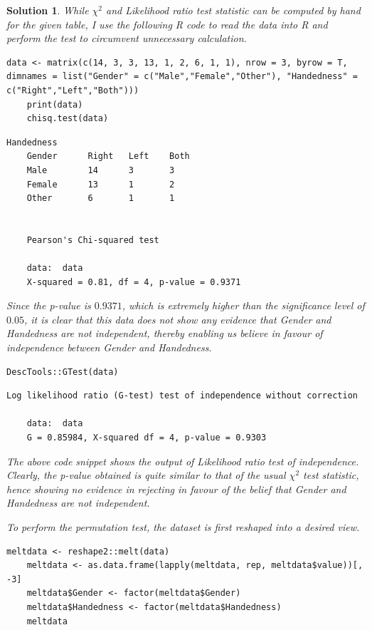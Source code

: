 \documentclass[12pt]{article}
\theoremstyle{problemstyle}
\newtheorem*{solution*}{Solution}
\begin{document}
\begin{solution*}

While $\chi^2$ and Likelihood ratio test statistic can be computed by hand for the given table, I use the following R code to read the data into R and perform the test to circumvent unnecessary calculation.

\begin{lstlisting}[style = R-code]
	data <- matrix(c(14, 3, 3, 13, 1, 2, 6, 1, 1), nrow = 3, byrow = T, dimnames = list("Gender" = c("Male","Female","Other"), "Handedness" = c("Right","Left","Both")))
	print(data)
	chisq.test(data)
\end{lstlisting}

\begin{lstlisting}[style = R-output]
	        	Handedness
	Gender   	Right 	Left 	Both
	Male      	14    	3    	3
	Female    	13    	1    	2
	Other      	6    	1    	1
	
	
	Pearson's Chi-squared test
	
	data:  data
	X-squared = 0.81, df = 4, p-value = 0.9371
\end{lstlisting}

Since the p-value is $0.9371$, which is extremely higher than the significance level of $0.05$, it is clear that this data does not show any evidence that Gender and Handedness are not independent, thereby enabling us believe in favour of independence between Gender and Handedness.

\begin{lstlisting}[style = R-code]
DescTools::GTest(data)
\end{lstlisting}

\begin{lstlisting}[style = R-output]
		Log likelihood ratio (G-test) test of independence without correction
	
	data:  data
	G = 0.85984, X-squared df = 4, p-value = 0.9303
\end{lstlisting}

The above code snippet shows the output of Likelihood ratio test of independence. Clearly, the p-value obtained is quite similar to that of the usual $\chi^2$ test statistic, hence showing no evidence in rejecting in favour of the belief that Gender and Handedness are not independent.

To perform the permutation test, the dataset is first reshaped into a desired view.

\begin{lstlisting}[style = R-code]
	meltdata <- reshape2::melt(data)
	meltdata <- as.data.frame(lapply(meltdata, rep, meltdata$value))[, -3]
	meltdata$Gender <- factor(meltdata$Gender)
	meltdata$Handedness <- factor(meltdata$Handedness)
	meltdata
\end{lstlisting} 


\end{solution*}
\end{document}

